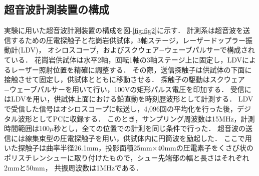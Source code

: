 \subsection{超音波計測装置の構成}
実験に用いた超音波計測装置の構成を図-\ref{fig:fig2}に示す．
計測系は超音波を送信するための圧電探触子と花崗岩供試体，3軸ステージ，レーザードップラー振動計(LDV)，
オシロスコープ，およびスクウェア−ウェーブパルサーで構成されている．
花崗岩供試体は水平2軸，回転1軸の3軸ステージ上に固定し，LDVによるレーザー照射位置を精確に調整する．
その際，送信探触子は供試体の下面に接触させて固定し，供試体とともに移動させる．
探触子の駆動はスクウェア−ウェーブパルサーを用いて行い，100Vの矩形パルス電圧を印加する．
受信にはLDVを用い，供試体上面における鉛直動を時刻歴波形として計測する．
LDVで受信した信号はオシロスコープに転送し，4,096回の平均化を行った後，デジタル波形としてPCに収録する．
このとき，サンプリング周波数は15MHz，計測時間範囲は100$\mu$秒とし，全ての位置での計測を同じ条件で行った．
超音波の送信には線集束型の圧電探触子を用い，供試体内に円筒波を励起した．
ここで用いた探触子は曲率半径26.1mm，投影面積25mm×40mmの圧電素子をくさび状の
ポリスチレンシューに取り付けたもので，シュー先端部の幅と長さはそれぞれ2mmと50mm，
共振周波数は1MHzである\cite{Kimoto}．
